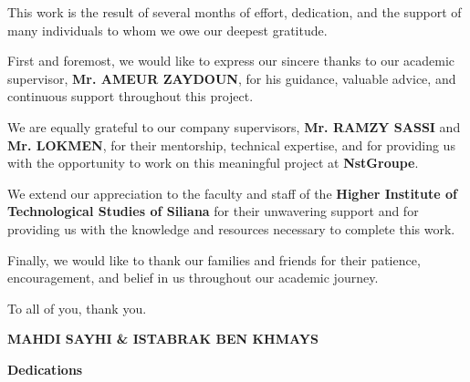 \documentclass[12pt,a4paper]{article}
\begin{document}
\begin{onehalfspace}
\fontsize{14}{17}\selectfont

This work is the result of several months of effort, dedication, and the support of many individuals to whom we owe our deepest gratitude.

First and foremost, we would like to express our sincere thanks to our academic supervisor, \textbf{Mr. AMEUR ZAYDOUN}, for his guidance, valuable advice, and continuous support throughout this project.

We are equally grateful to our company supervisors, \textbf{Mr. RAMZY SASSI} and \textbf{Mr. LOKMEN}, for their mentorship, technical expertise, and for providing us with the opportunity to work on this meaningful project at \textbf{NstGroupe}.

We extend our appreciation to the faculty and staff of the \textbf{Higher Institute of Technological Studies of Siliana} for their unwavering support and for providing us with the knowledge and resources necessary to complete this work.

Finally, we would like to thank our families and friends for their patience, encouragement, and belief in us throughout our academic journey.

To all of you, thank you.

\end{onehalfspace}

\vfill
\begin{flushright}
{\large\bfseries MAHDI SAYHI \& ISTABRAK BEN KHMAYS}
\end{flushright}

\newpage


\vspace*{1cm}

\begin{center}
{\bfseries\fontsize{22}{26}\selectfont Dedications}
\end{center}

\vspace{1cm}
\end{document}
